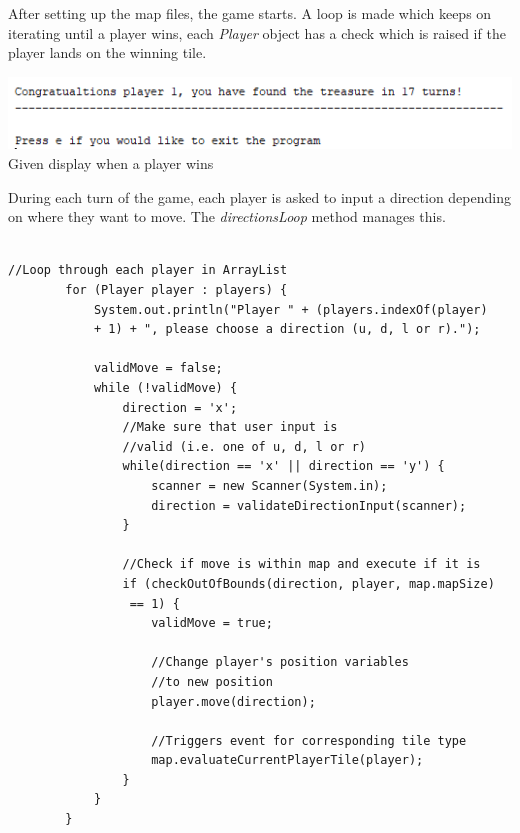 \documentclass[a4paper,12pt]{extarticle}
\begin{document}
\noindent After setting up the map files, the game starts. A loop is made which keeps on iterating until a player wins, each \textit{Player} object has a check which is raised if the player lands on the winning tile.\\

\begin{center}
\includegraphics[scale=1]{BasicMap3.png}
\hspace{1mm}
Given display when a player wins
\end{center}

During each turn of the game, each player is asked to input a direction depending on where they want to move. The \textit{directionsLoop} method manages this.\\

\newpage
\begin{lstlisting}

//Loop through each player in ArrayList
        for (Player player : players) {
            System.out.println("Player " + (players.indexOf(player) 
            + 1) + ", please choose a direction (u, d, l or r).");

            validMove = false;
            while (!validMove) {
                direction = 'x';
                //Make sure that user input is
                //valid (i.e. one of u, d, l or r)
                while(direction == 'x' || direction == 'y') {
                    scanner = new Scanner(System.in);
                    direction = validateDirectionInput(scanner);
                }

                //Check if move is within map and execute if it is
                if (checkOutOfBounds(direction, player, map.mapSize)
                 == 1) {
                    validMove = true;

                    //Change player's position variables 
                    //to new position
                    player.move(direction);

                    //Triggers event for corresponding tile type
                    map.evaluateCurrentPlayerTile(player);
                }
            }
        }

\end{lstlisting}
\vspace{4mm}
\end{document}
